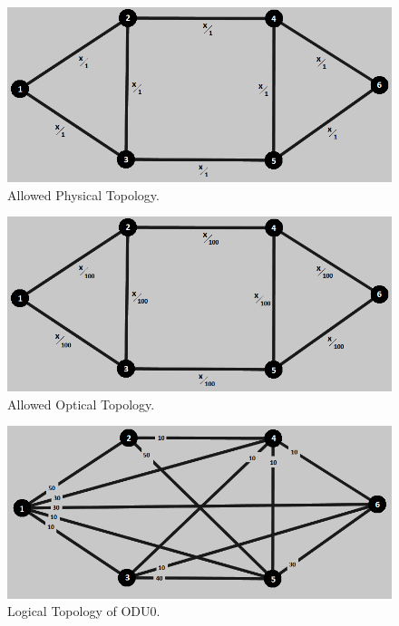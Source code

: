 \begin{figure}[H]
\centering
\includegraphics[width=13cm]{sdf/heuristic/figures/topologies/opaque_protec/medium/allowed_physical_medium}
\caption{Allowed Physical Topology.}
\label{allowed_physical_protec_ref_medium_heuristic}
\end{figure}

\begin{figure}[H]
\centering
\includegraphics[width=13cm]{sdf/heuristic/figures/topologies/opaque_protec/medium/allowed_optical_medium}
\caption{Allowed Optical Topology.}
\label{allowed_optical_protec_ref_medium_heuristic}
\end{figure}

\begin{figure}[H]
\centering
\includegraphics[width=13cm]{sdf/heuristic/figures/topologies/opaque_protec/medium/logical_topology_odu0_medium}
\caption{Logical Topology of ODU0.}
\label{logical_ODU0_protec_ref_medium_heuristic}
\end{figure}

